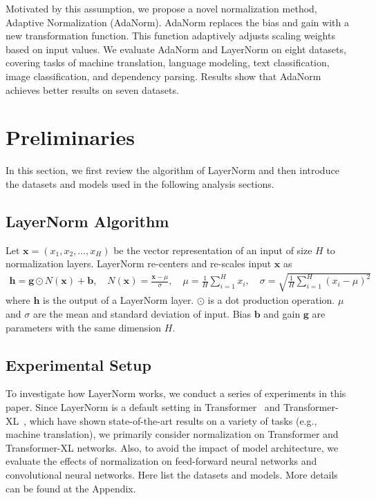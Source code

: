 \documentclass{article}
\newcommand*{\vect}[1]{\textbf{#1}}
\begin{document}
Motivated by this assumption, we propose a novel normalization method,  Adaptive Normalization (AdaNorm). AdaNorm replaces the bias and gain with a new transformation function. This function adaptively adjusts scaling weights based on input values. 
We evaluate AdaNorm and LayerNorm on eight datasets, covering tasks of machine translation, language modeling, text classification, image classification, and dependency parsing.  Results show that AdaNorm achieves better results on seven datasets. 



\section{Preliminaries}
In this section, we first review the algorithm of LayerNorm and then introduce the datasets and models used in the following analysis sections. 

\subsection{LayerNorm Algorithm}
Let $\vect{x}=(x_1, x_2, \ldots, x_H)$ be the vector representation of an input of size $H$ to normalization layers. LayerNorm re-centers and re-scales input $\vect{x}$ as
\begin{equation}\begin{aligned}
\vect{h}=\vect{g}\odot N(\vect{x})+\vect{b}, \quad
N(\vect{x}) = \frac{\vect{x}-\mu}{\sigma}, \quad
\mu=\frac{1}{H}\sum\limits_{i=1}^Hx_i,\quad
\sigma=\sqrt{\frac{1}{H}\sum\limits_{i=1}^H(x_i-\mu)^2}
\end{aligned}\end{equation}
where $\vect{h}$ is the output of a LayerNorm layer. $\odot$ is a dot production operation. $\mu$ and $\sigma$ are the mean and standard deviation of input. 
Bias $\vect{b}$ and gain $\vect{g}$ are parameters with the same dimension $H$.  

\subsection{Experimental Setup}

To investigate how LayerNorm works, we conduct a series of experiments in this paper. 
Since LayerNorm is a default setting in Transformer~\citep{DBLP:conf/nips/VaswaniSPUJGKP17} and Transformer-XL~\citep{dai2019transformer}, which have shown state-of-the-art results on a variety of tasks (e.g., machine translation), we primarily consider normalization on Transformer and Transformer-XL networks. 
Also, 
to avoid the impact of model architecture, 
we evaluate the effects of normalization on feed-forward neural networks and convolutional neural networks. Here list the datasets and models. More details can be found at the Appendix.
\end{document}
